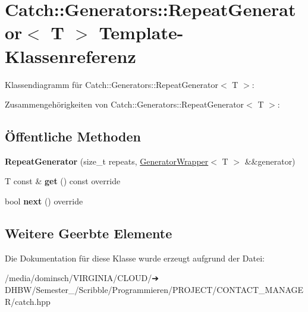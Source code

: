 \hypertarget{classCatch_1_1Generators_1_1RepeatGenerator}{}\section{Catch\+:\+:Generators\+:\+:Repeat\+Generator$<$ T $>$ Template-\/\+Klassenreferenz}
\label{classCatch_1_1Generators_1_1RepeatGenerator}


Klassendiagramm für Catch\+:\+:Generators\+:\+:Repeat\+Generator$<$ T $>$\+:


Zusammengehörigkeiten von Catch\+:\+:Generators\+:\+:Repeat\+Generator$<$ T $>$\+:
\subsection*{Öffentliche Methoden}
\begin{DoxyCompactItemize}
\item 
\mbox{\label{classCatch_1_1Generators_1_1RepeatGenerator_a3aee12c4f9c2c04823ca3c75a20f234f}} 
{\bfseries Repeat\+Generator} (size\+\_\+t repeats, \hyperlink{classCatch_1_1Generators_1_1GeneratorWrapper}{Generator\+Wrapper}$<$ T $>$ \&\&generator)
\item 
\mbox{\label{classCatch_1_1Generators_1_1RepeatGenerator_a43bd573274c9a0cd7f4406a3d0d36d49}} 
T const  \& {\bfseries get} () const override
\item 
\mbox{\label{classCatch_1_1Generators_1_1RepeatGenerator_a24d5c2b1c09d6d220d4bd4c83f222dcb}} 
bool {\bfseries next} () override
\end{DoxyCompactItemize}
\subsection*{Weitere Geerbte Elemente}


Die Dokumentation für diese Klasse wurde erzeugt aufgrund der Datei\+:\begin{DoxyCompactItemize}
\item 
/media/dominsch/\+V\+I\+R\+G\+I\+N\+I\+A/\+C\+L\+O\+U\+D/➔ D\+H\+B\+W/\+Semester\+\_/\+Scribble/\+Programmieren/\+P\+R\+O\+J\+E\+C\+T/\+C\+O\+N\+T\+A\+C\+T\+\_\+\+M\+A\+N\+A\+G\+E\+R/catch.\+hpp\end{DoxyCompactItemize}
